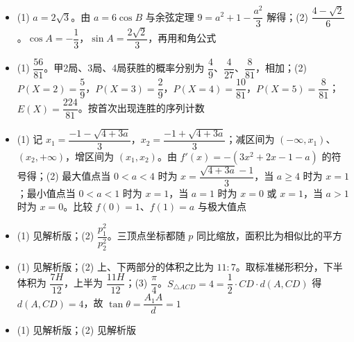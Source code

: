 \begin{itemize}[leftmargin=2.6em]
  \item[\textbf{16.}] (1) $a=2\sqrt3$。由 $a=6\cos B$ 与余弦定理 $9=a^2+1-\dfrac{a^2}3$ 解得；(2) $\dfrac{4-\sqrt2}{6}$。$\cos A=-\dfrac13$，$\sin A=\dfrac{2\sqrt2}3$，再用和角公式
  \item[\textbf{17.}] (1) $\dfrac{56}{81}$。甲2局、3局、4局获胜的概率分别为 $\dfrac49$、$\dfrac4{27}$、$\dfrac8{81}$，相加；(2) $P(X=2)=\dfrac59$，$P(X=3)=\dfrac29$，$P(X=4)=\dfrac{10}{81}$，$P(X=5)=\dfrac8{81}$；$E(X)=\dfrac{224}{81}$。按首次出现连胜的序列计数
  \item[\textbf{18.}] (1) 记 $x_1=\dfrac{-1-\sqrt{4+3a}}3$，$x_2=\dfrac{-1+\sqrt{4+3a}}3$；减区间为 $(-\infty,x_1)$、$(x_2,+\infty)$，增区间为 $(x_1,x_2)$。由 $f'(x)=-(3x^2+2x-1-a)$ 的符号得；(2) 最大值点当 $0<a<4$ 时为 $x=\dfrac{\sqrt{4+3a}-1}{3}$，当 $a\geqslant4$ 时为 $x=1$；最小值点当 $0<a<1$ 时为 $x=1$，当 $a=1$ 时为 $x=0$ 或 $x=1$，当 $a>1$ 时为 $x=0$。比较 $f(0)=1$、$f(1)=a$ 与极大值点
  \item[\textbf{19.}] (1) 见解析版；(2) $\dfrac{p_1^2}{p_2^2}$。三顶点坐标都随 $p$ 同比缩放，面积比为相似比的平方
  \item[\textbf{20.}] (1) 见解析版；(2) 上、下两部分的体积之比为 $11:7$。取标准梯形积分，下半体积为 $\dfrac{7H}{12}$，上半为 $\dfrac{11H}{12}$；(3) $\dfrac\pi4$。$S_{\triangle ACD}=4=\dfrac12\cdot CD\cdot d(A,CD)$ 得 $d(A,CD)=4$，故 $\tan\theta=\dfrac{A_1A}{d}=1$
  \item[\textbf{21.}] (1) 见解析版；(2) 见解析版
\end{itemize}
